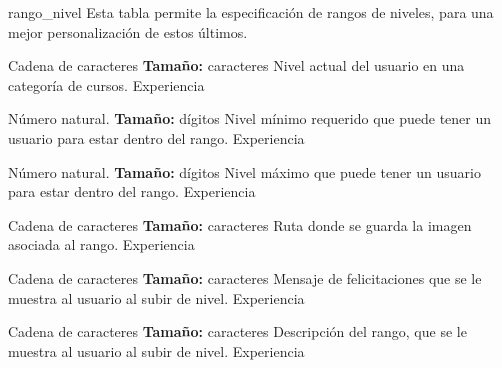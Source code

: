     \begin{Entidad}
        {rango\_nivel}
            {Esta tabla permite la especificación de rangos de niveles, para una mejor personalización de estos últimos.\\}
            
            
            {Cadena de \newline caracteres \newline \textbf{Tamaño:} caracteres}
            {Nivel actual del usuario en una categoría de cursos.}
                {
                }
            {Experiencia}
            
            {Número \newline natural. \newline \textbf{Tamaño:} dígitos }
            {Nivel mínimo requerido que puede tener un usuario para estar dentro del rango.}
                {
                }
            {Experiencia}
            
            {Número \newline natural. \newline \textbf{Tamaño:} dígitos }
            {Nivel máximo que puede tener un usuario para estar dentro del rango.}
                {
                }
            {Experiencia}
            
            {Cadena de \newline caracteres \newline \textbf{Tamaño:} caracteres}
            {Ruta donde se guarda la imagen asociada al rango.}
                {
                }
            {Experiencia}
            
            
            {Cadena de \newline caracteres \newline \textbf{Tamaño:} caracteres}
            {Mensaje de felicitaciones que se le muestra al usuario al subir de nivel.}
                {
                }
            {Experiencia}
            
            {Cadena de \newline caracteres \newline \textbf{Tamaño:} caracteres}
            {Descripción del rango, que se le muestra al usuario al subir de nivel.}
                {
                }
            {Experiencia}
            
            
    \end{Entidad}

